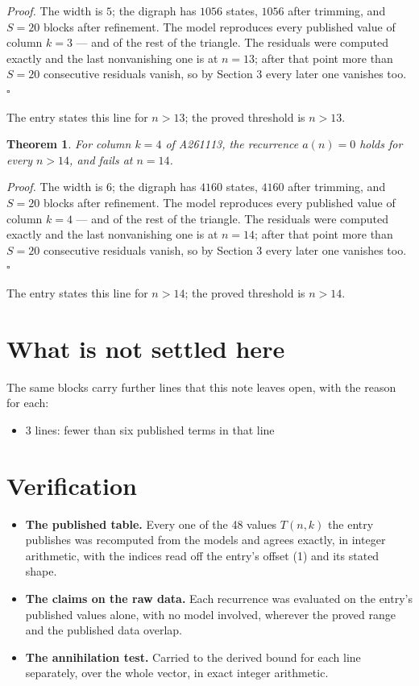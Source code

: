 \documentclass[11pt]{article}
\newtheorem{theorem}{Theorem}
\theoremstyle{definition}
\begin{document}
{\itshape Proof.} The width is $5$; the digraph has $1056$ states, $1056$ after trimming, and $S = 20$ blocks after refinement. The model reproduces every published value of column $k = 3$ --- and of the rest of the triangle. The residuals were computed exactly and the last nonvanishing one is at $n = 13$; after that point more than $S = 20$ consecutive residuals vanish, so by Section 3 every later one vanishes too. $\square$

The entry states this line for $n > 13$; the proved threshold is $n > 13$.

\begin{theorem} For column $k = 4$ of A261113, the recurrence $a(n) = 0$ holds for every $n > 14$, and fails at $n = 14$.\end{theorem}

{\itshape Proof.} The width is $6$; the digraph has $4160$ states, $4160$ after trimming, and $S = 20$ blocks after refinement. The model reproduces every published value of column $k = 4$ --- and of the rest of the triangle. The residuals were computed exactly and the last nonvanishing one is at $n = 14$; after that point more than $S = 20$ consecutive residuals vanish, so by Section 3 every later one vanishes too. $\square$

The entry states this line for $n > 14$; the proved threshold is $n > 14$.

\section{What is not settled here}

The same blocks carry further lines that this note leaves open, with the reason for each:

\begin{itemize}

\item 3 lines: fewer than six published terms in that line

\end{itemize}

\section{Verification}

\begin{itemize}

\item {\bfseries The published table.} Every one of the 48 values $T(n,k)$ the entry publishes was recomputed from the models and agrees exactly, in integer arithmetic, with the indices read off the entry's offset (1) and its stated shape.

\item {\bfseries The claims on the raw data.} Each recurrence was evaluated on the entry's published values alone, with no model involved, wherever the proved range and the published data overlap.

\item {\bfseries The annihilation test.} Carried to the derived bound for each line separately, over the whole vector, in exact integer arithmetic.

\end{itemize}
\end{document}
